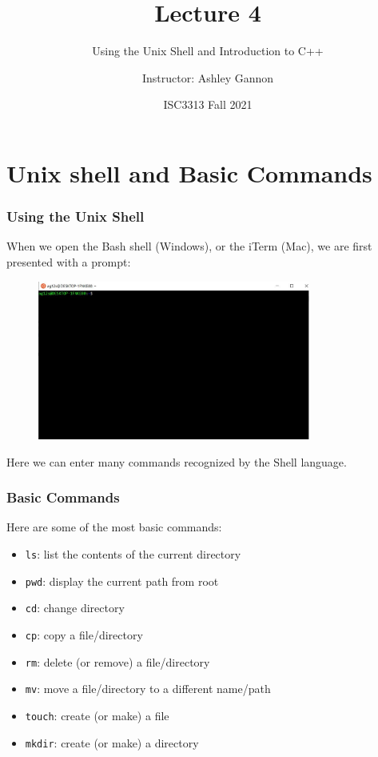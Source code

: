 \documentclass{if-beamer}
\title[Lecture 4]{Lecture 4}
\subtitle{Using the Unix Shell and Introduction to C++}
\author{Instructor: Ashley Gannon}
\date{ISC3313 Fall 2021}
\begin{document}
\begin{frame}
  \titlepage
\end{frame}
\section{Unix shell and Basic Commands}

\begin{frame}
\frametitle{Using the Unix Shell}
When we open the Bash shell (Windows), or the iTerm (Mac),
we are first presented with a prompt:
\begin{figure}
	\center
	\includegraphics[width=0.8\textwidth]{bashwindow.jpg}
\end{figure}
Here we can enter many commands recognized by the Shell language.
\end{frame} 

\begin{frame}
\frametitle{Basic Commands}
Here are some of the most basic commands:
\begin{itemize}
\item \texttt{ls}: list the contents of the current directory
\item \texttt{pwd}: display the current path from root
\item \texttt{cd}: change directory
\item \texttt{cp}: copy a file/directory
\item \texttt{rm}: delete (or remove) a file/directory
\item \texttt{mv}: move a file/directory to a different name/path
\item \texttt{touch}: create (or make) a file
\item \texttt{mkdir}: create (or make) a directory
\end{itemize}
\end{frame}
\end{document}
